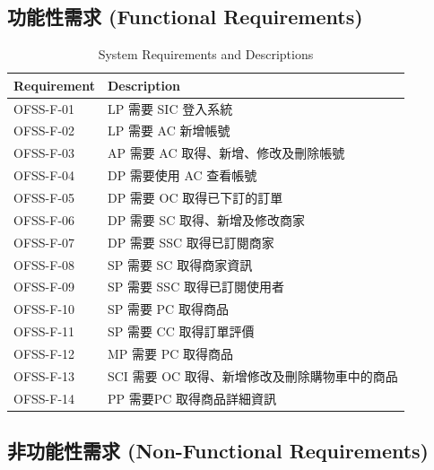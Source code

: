 \documentclass[a4paper, 12pt]{article}
\begin{document}
\subsection{功能性需求 (Functional Requirements)}
\begin{table}[h]
    \centering
    \renewcommand{\arraystretch}{1.35}
    \begin{tabular}{|p{3cm}|p{8cm}|}
        \hline
        \textbf{Requirement} & \textbf{Description} \\
        \hline
        OFSS-F-01 & LP 需要 SIC 登入系統 \\
        \hline
        OFSS-F-02 & LP 需要 AC 新增帳號 \\
        \hline
        OFSS-F-03 & AP 需要 AC 取得、新增、修改及刪除帳號 \\
        \hline 
        OFSS-F-04 & DP 需要使用 AC 查看帳號 \\
        \hline 
        OFSS-F-05 & DP 需要 OC 取得已下訂的訂單 \\
        \hline 
        OFSS-F-06 & DP 需要 SC 取得、新增及修改商家 \\
        \hline 
        OFSS-F-07 & DP 需要 SSC 取得已訂閱商家 \\
        \hline 
        OFSS-F-08 & SP 需要 SC 取得商家資訊 \\
        \hline 
        OFSS-F-09 & SP 需要 SSC 取得已訂閱使用者 \\
        \hline 
        OFSS-F-10 & SP 需要 PC 取得商品 \\
        \hline 
        OFSS-F-11 & SP 需要 CC 取得訂單評價 \\
        \hline 
        OFSS-F-12 & MP 需要 PC 取得商品 \\
        \hline 
        OFSS-F-13 & SCI 需要 OC 取得、新增修改及刪除購物車中的商品 \\
        \hline 
        OFSS-F-14 & PP 需要PC 取得商品詳細資訊 \\
        \hline 
    \end{tabular}
    \caption{System Requirements and Descriptions}
    \label{tab:system-requirements}
\end{table}
\newpage
\subsection{非功能性需求 (Non-Functional Requirements)}
\end{document}
